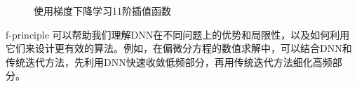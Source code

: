\begin{figure}[htbp!]
    \caption{使用梯度下降学习11阶插值函数}
    \label{fig:fpfour}
  \end{figure}


f-principle 可以帮助我们理解DNN在不同问题上的优势和局限性，以及如何利用它们来设计更有效的算法。例如，在偏微分方程的数值求解中\cite{cai1996adaptive}，可以结合DNN和传统迭代方法，先利用DNN快速收敛低频部分，再用传统迭代方法细化高频部分。

